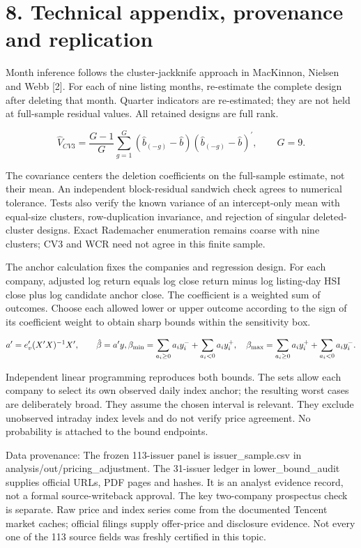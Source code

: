 \documentclass[10pt,a4paper]{article}
\begin{document}
\clearpage

\section*{8. Technical appendix, provenance and replication}

Month inference follows the cluster-jackknife approach in MacKinnon, Nielsen and Webb [2]. For each of nine listing months, re-estimate the complete design after deleting that month. Quarter indicators are re-estimated; they are not held at full-sample residual values. All retained designs are full rank.

\[
\widehat V_{CV3}=\frac{G-1}{G}\sum_{g=1}^{G}(\hat b_{(-g)}-\hat b)(\hat b_{(-g)}-\hat b)^{\prime},\qquad G=9.
\]

The covariance centers the deletion coefficients on the full-sample estimate, not their mean. An independent block-residual sandwich check agrees to numerical tolerance. Tests also verify the known variance of an intercept-only mean with equal-size clusters, row-duplication invariance, and rejection of singular deleted-cluster designs. Exact Rademacher enumeration remains coarse with nine clusters; CV3 and WCR need not agree in this finite sample.

The anchor calculation fixes the companies and regression design. For each company, adjusted log return equals log close return minus log listing-day HSI close plus log candidate anchor close. The coefficient is a weighted sum of outcomes. Choose each allowed lower or upper outcome according to the sign of its coefficient weight to obtain sharp bounds within the sensitivity box.

\[
a^{\prime}=e_v^{\prime}(X^{\prime}X)^{-1}X^{\prime},\qquad \hat\beta=a^{\prime}y,\\ \beta_{\min}=\sum_{a_i\geq0}a_i y_i^-+\sum_{a_i<0}a_i y_i^+,\quad \beta_{\max}=\sum_{a_i\geq0}a_i y_i^++\sum_{a_i<0}a_i y_i^-.
\]

Independent linear programming reproduces both bounds. The sets allow each company to select its own observed daily index anchor; the resulting worst cases are deliberately broad. They assume the chosen interval is relevant. They exclude unobserved intraday index levels and do not verify price agreement. No probability is attached to the bound endpoints.

Data provenance: The frozen 113-issuer panel is issuer\_sample.csv in analysis/out/pricing\_adjustment. The 31-issuer ledger in lower\_bound\_audit supplies official URLs, PDF pages and hashes. It is an analyst evidence record, not a formal source-writeback approval. The key two-company prospectus check is separate. Raw price and index series come from the documented Tencent market caches; official filings supply offer-price and disclosure evidence. Not every one of the 113 source fields was freshly certified in this topic.
\end{document}
